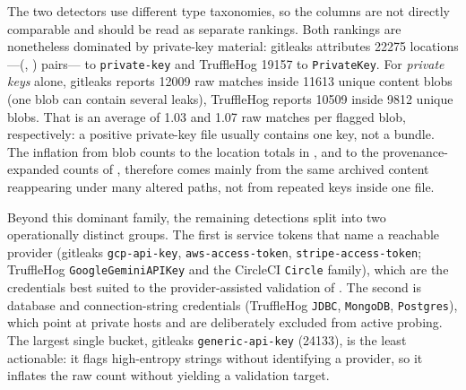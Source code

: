 The two detectors use different type taxonomies, so the columns are not directly comparable and should be read as separate rankings.
Both rankings are nonetheless dominated by private-key material: gitleaks attributes \num{22275} locations---(, ) pairs--- to \texttt{private-key} and TruffleHog \num{19157} to \texttt{PrivateKey}.
For \emph{private keys} alone, gitleaks reports \num{12009} raw matches inside \num{11613} unique content blobs (one blob can contain several leaks), TruffleHog reports \num{10509} inside \num{9812} unique blobs.
That is an average of \num{1.03} and \num{1.07} raw matches per flagged blob, respectively: a positive private-key file usually contains one key, not a bundle.
The inflation from blob counts to the location totals in , and to the provenance-expanded counts of , therefore comes mainly from the same archived content reappearing under many altered paths, not from repeated keys inside one file.

Beyond this dominant family, the remaining detections split into two operationally distinct groups.
The first is service tokens that name a reachable provider (gitleaks \texttt{gcp-api-key}, \texttt{aws-access-token}, \texttt{stripe-access-token}; TruffleHog \texttt{GoogleGeminiAPIKey} and the CircleCI \texttt{Circle} family), which are the credentials best suited to the provider-assisted validation of .
The second is database and connection-string credentials (TruffleHog \texttt{JDBC}, \texttt{MongoDB}, \texttt{Postgres}), which point at private hosts and are deliberately excluded from active probing.
The largest single bucket, gitleaks \texttt{generic-api-key} (\num{24133}), is the least actionable: it flags high-entropy strings without identifying a provider, so it inflates the raw count without yielding a validation target.

